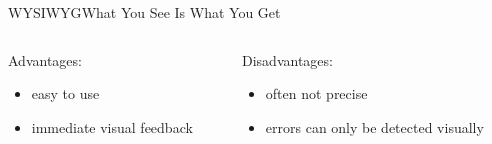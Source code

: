 \documentclass{setbeamer}
\begin{document}
\begin{frame}{WYSIWYG}{What You See Is What You Get}
    \vspace{3mm}
    \begin{columns}
        \begin{column}{0.5\textwidth}
            Advantages:
            \begin{itemize}
                \item easy to use
                \item immediate visual feedback
            \end{itemize}
        \end{column}

        \begin{column}{0.5\textwidth}
            Disadvantages:
            \begin{itemize}
                \item often not precise
                \item errors can only be detected visually
            \end{itemize}
        \end{column}
    \end{columns}
\end{frame}
\end{document}
